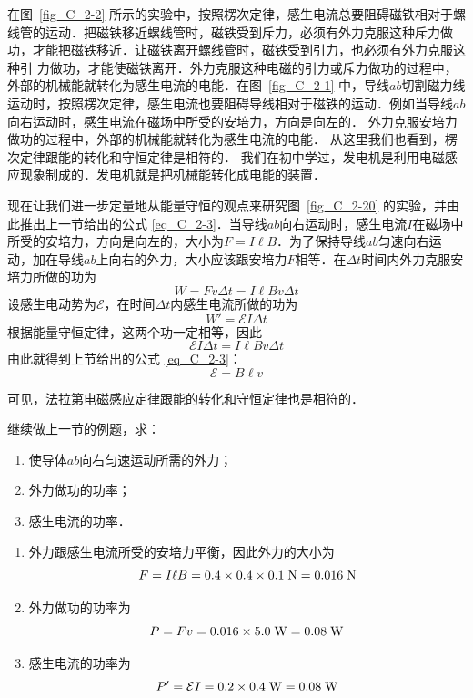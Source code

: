 在图~\ref{fig_C_2-2} 所示的实验中，按照楞次定律，感生电流总要阻碍磁铁相对于螺线管的运动．把磁铁移近螺线管时，磁铁受到斥力，必须有外力克服这种斥力做功，才能把磁铁移近．让磁铁离开螺线管时，磁铁受到引力，也必须有外力克服这种引
力做功，才能使磁铁离开．外力克服这种电磁的引力或斥力做功的过程中，外部的机械能就转化为感生电流的电能．在图~\ref{fig_C_2-1} 中，导线$ab$切割磁力线运动时，按照楞次定律，感生电流也要阻碍导线相对于磁铁的运动．例如当导线$ab$向右运动时，感生电流在磁场中所受的安培力，方向是向左的．
外力克服安培力做功的过程中，外部的机械能就转化为感生电流的电能．
从这里我们也看到，楞次定律跟能的转化和守恒定律是相符的．
我们在初中学过，发电机是利用电磁感应现象制成的．发电机就是把机械能转化成电能的装置．

现在让我们进一步定量地从能量守恒的观点来研究图~\ref{fig_C_2-20} 的实验，并由此推出上一节给出的公式 \eqref{eq_C_2-3}．当导线$ab$向右运动时，感生电流$I$在磁场中所受的安培力，方向是向左的，大小为$F=I\ell B$．为了保持导线$ab$匀速向右运动，加在导线$ab$上向右的外力，大小应该跟安培力$F$相等．在$\Delta t$时间内外力克服安培力所做的功为
\[W=Fv\Delta t=I\ell Bv\Delta t\]
设感生电动势为$\mathcal{E}$，在时间$\Delta t$内感生电流所做的功为
\[W'=\mathcal{E}I\Delta t\]
根据能量守恒定律，这两个功一定相等，因此
\[\mathcal{E}I\Delta t=I\ell B v \Delta t\]
由此就得到上节给出的公式 \eqref{eq_C_2-3}：
\[\mathcal{E}=B\ell v\]

可见，法拉第电磁感应定律跟能的转化和守恒定律也是相符的．

\begin{example}
继续做上一节的例题，求：
\begin{enumerate}
    \item 使导体$ab$向右匀速运动所需的外力；
    \item 外力做功的功率；
    \item 感生电流的功率．
\end{enumerate}
\end{example}

\begin{solution}
    \begin{enumerate}
        \item 外力跟感生电流所受的安培力平衡，因此外力的大小为
        \[F=I\ell B=0.4\times0.4\times0.1 \;\text{N}
        =0.016 \;\text{N} \]
        \item 外力做功的功率为
        \[P=Fv=0.016\times5.0 \;\text{W} =0.08 \;\text{W} \]
        \item 感生电流的功率为
        \[P'=\mathcal{E}I=0.2\times0.4 \;\text{W} =0.08 \;\text{W} \]
    \end{enumerate}
\end{solution}

